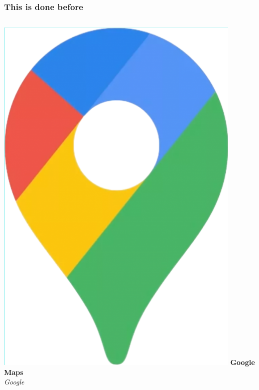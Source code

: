 \documentclass{beamer}
\begin{document}
\begin{frame}
  \frametitle{This is done before}
	\begin{columns}
		\includegraphics[height=0.5\textheight]{./img/google-maps.png}
		\textbf{Google Maps}\\
		\textit{Google}

\end{columns}
\end{frame}
\end{document}
